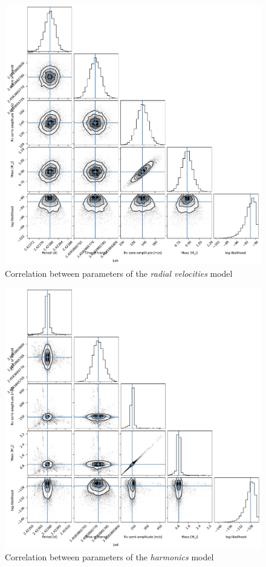 \documentclass[a4paper,11pt,twocolumn]{article}
\begin{document}
\begin{figure}[h]
    \centering
      \includegraphics[scale=0.4, angle=0]{../pictures/RV/WASP44_RV_cornerplot.pdf}
      \caption{Correlation between parameters of the \textit{radial velocities} model}
     \label{fig: cpRV}
\end{figure}

\begin{figure}[h]
    \centering
      \includegraphics[scale=0.4, angle=0]{../pictures/RV/WASP44_RV_harmonics_cornerplot.pdf}
      \caption{Correlation between parameters of the \textit{harmonics} model}
     \label{fig: cpRV2}
\end{figure}
\end{document}
